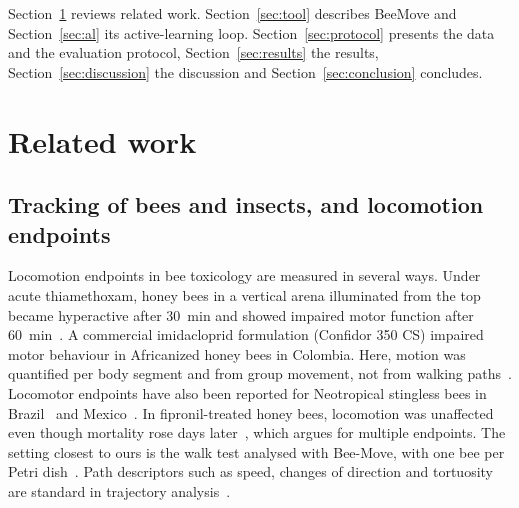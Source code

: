 \documentclass[pdflatex,sn-basic,Numbered]{sn-jnl}
\newcommand{\beemove}{BeeMove}
\theoremstyle{thmstyleone}%
\begin{document}
Section~\ref{sec:related} reviews related work. Section~\ref{sec:tool} describes \beemove{} and Section~\ref{sec:al} its active-learning loop. Section~\ref{sec:protocol} presents the data and the evaluation protocol, Section~\ref{sec:results} the results, Section~\ref{sec:discussion} the discussion and Section~\ref{sec:conclusion} concludes.

\section{Related work}\label{sec:related}


\subsection{Tracking of bees and insects, and locomotion endpoints}\label{sec:rw-bees}

Locomotion endpoints in bee toxicology are measured in several ways. Under acute thiamethoxam, honey bees in a vertical arena illuminated from the top became hyperactive after 30~min and showed impaired motor function after 60~min~\cite{tosi2017common}. A commercial imidacloprid formulation (Confidor 350 CS) impaired motor behaviour in Africanized honey bees in Colombia. Here, motion was quantified per body segment and from group movement, not from walking paths~\cite{hernandez2026sublethal}. Locomotor endpoints have also been reported for Neotropical stingless bees in Brazil~\cite{fardergomes2024exposure,piovesan2020effects} and Mexico~\cite{ruizsanchez2026effect}. In fipronil-treated honey bees, locomotion was unaffected even though mortality rose days later~\cite{charreton2015locomotor}, which argues for multiple endpoints. The setting closest to ours is the walk test analysed with Bee-Move, with one bee per Petri dish~\cite{libardoni2021possible}. Path descriptors such as speed, changes of direction and tortuosity are standard in trajectory analysis~\cite{benhamou2004how,mclean2018trajr}.
\end{document}
